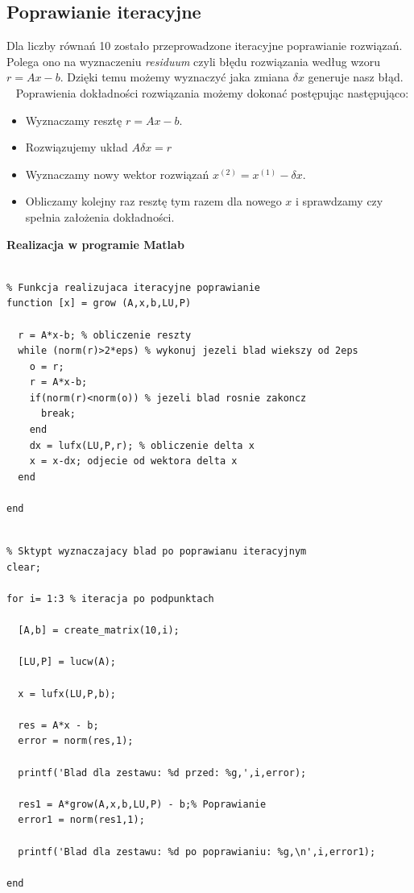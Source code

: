 \documentclass[a4paper, 11pt]{article}
\begin{document}
\subsection{Poprawianie iteracyjne}
Dla liczby równań 10 zostało przeprowadzone iteracyjne poprawianie rozwiązań. Polega ono na wyznaczeniu \textsl{residuum} czyli błędu rozwiązania według wzoru $r = Ax -b$. Dzięki temu możemy wyznaczyć jaka zmiana $\delta x$ generuje nasz błąd. ~\cite{fifth}
Poprawienia dokładności rozwiązania możemy dokonać postępując następująco: 
\begin{itemize}
\item Wyznaczamy resztę $r = Ax -b$.
\item Rozwiązujemy układ $A\delta x = r$
\item Wyznaczamy nowy wektor rozwiązań $x^{(2)} = x^{(1)} -\delta x$.
\item Obliczamy kolejny raz resztę tym razem dla nowego $x$ i sprawdzamy czy spełnia założenia dokładności.
\end{itemize}

\textbf{Realizacja w programie Matlab}\\
\\
\begin{lstlisting}
% Funkcja realizujaca iteracyjne poprawianie
function [x] = grow (A,x,b,LU,P)

  r = A*x-b; % obliczenie reszty
  while (norm(r)>2*eps) % wykonuj jezeli blad wiekszy od 2eps
    o = r; 
    r = A*x-b;
    if(norm(r)<norm(o)) % jezeli blad rosnie zakoncz
      break; 
    end
    dx = lufx(LU,P,r); % obliczenie delta x
    x = x-dx; odjecie od wektora delta x
  end

end

\end{lstlisting}

\begin{lstlisting}

% Sktypt wyznaczajacy blad po poprawianu iteracyjnym
clear;

for i= 1:3 % iteracja po podpunktach
  
  [A,b] = create_matrix(10,i);

  [LU,P] = lucw(A);
  
  x = lufx(LU,P,b);
  
  res = A*x - b;
  error = norm(res,1); 
  
  printf('Blad dla zestawu: %d przed: %g,',i,error); 
   
  res1 = A*grow(A,x,b,LU,P) - b;% Poprawianie
  error1 = norm(res1,1);
  
  printf('Blad dla zestawu: %d po poprawianiu: %g,\n',i,error1);
  
end

\end{lstlisting}
\end{document}
